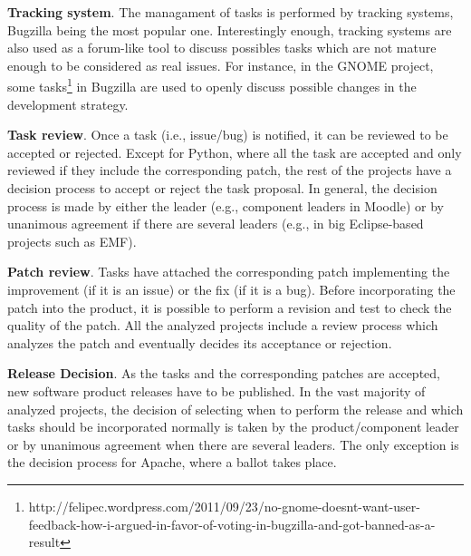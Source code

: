 \vspace{0.15em}
\noindent \textbf{Tracking system}. The managament of tasks is performed by tracking systems, Bugzilla being the most popular one. Interestingly enough, tracking systems are also used as a forum-like tool to discuss possibles tasks which are not mature enough to be considered as real issues. For instance, in the GNOME project, some tasks\footnote{http://felipec.wordpress.com/2011/09/23/no-gnome-doesnt-want-user-feedback-how-i-argued-in-favor-of-voting-in-bugzilla-and-got-banned-as-a-result} in Bugzilla are used to openly discuss possible changes in the development strategy.


\vspace{0.15em}
\noindent \textbf{Task review}. Once a task (i.e., issue/bug) is notified, it can be reviewed to be accepted or rejected. Except for Python, where all the task are accepted and only reviewed if they include the corresponding patch, the rest of the projects have a decision process to accept or reject the task proposal. In general, the decision process is made by either the leader (e.g., component leaders in Moodle) or by unanimous agreement if there are several leaders (e.g., in big Eclipse-based projects such as EMF).

\vspace{0.15em}
\noindent \textbf{Patch review}. Tasks have attached the corresponding patch implementing the improvement (if it is an issue) or the fix (if it is a bug). Before incorporating the patch into the product, it is possible to perform a revision and test to check the quality of the patch. All the analyzed projects include a review process which analyzes the patch and eventually decides its acceptance or rejection.

\vspace{0.15em}
\noindent \textbf{Release Decision}. As the tasks and the corresponding patches are accepted, new software product releases have to be published. In the vast majority of analyzed projects, the decision of selecting when to perform the release and which tasks should be incorporated normally is taken by the product/component leader or by unanimous agreement when there are several leaders. The only exception is the decision process for Apache, where a ballot takes place.

